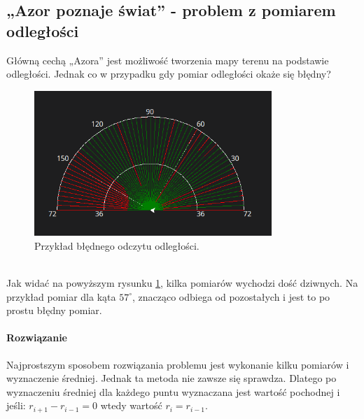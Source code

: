     \subsection{„Azor poznaje świat” - problem z pomiarem odległości}
        \tab Główną cechą „Azora” jest możliwość  tworzenia mapy terenu na podstawie odległości.
        Jednak co w przypadku gdy pomiar odległości okaże się błędny?
        \begin{figure}[!h]
            \centering
            \includegraphics[width = 0.8\textwidth]{Img/radar_error.png}
            \caption{Przykład błędnego odczytu odległości.}
            \label{error:radar_error}
        \end{figure}
        \\Jak widać na powyższym rysunku \ref{error:radar_error}, kilka pomiarów wychodzi dość dziwnych.
        Na przykład pomiar dla kąta $57^\circ$, znacząco odbiega od pozostałych i jest to po prostu błędny pomiar.

        \paragraph{Rozwiązanie\\}
        Najprostszym sposobem rozwiązania problemu jest wykonanie kilku pomiarów i wyznaczenie średniej.
        Jednak ta metoda nie zawsze się sprawdza.
        Dlatego po wyznaczeniu średniej dla każdego puntu wyznaczana jest wartość pochodnej i jeśli: $r_{i+1} - r_{i-1} = 0$ wtedy wartość $r_i = r_{i-1}$.